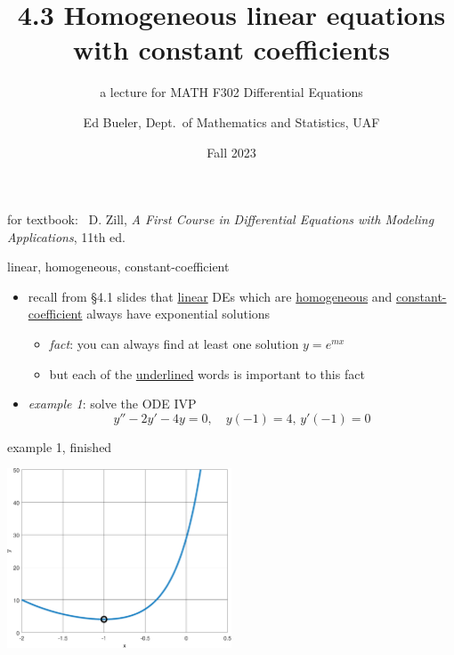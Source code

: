 \documentclass{beamer}
\title{4.3 Homogeneous linear equations \\ with constant coefficients}
\subtitle{a lecture for MATH F302 Differential Equations}
\author{Ed Bueler, Dept.~of Mathematics and Statistics, UAF}
\date{Fall 2023}
\begin{document}


\begin{frame}
\titlepage

\centerline{\tiny for textbook: \, D. Zill, \emph{A First Course in Differential Equations with Modeling Applications}, 11th ed.}
\end{frame}

\begin{frame}{linear, homogeneous, constant-coefficient}

\begin{itemize}
\item recall from \S4.1 slides that \underline{linear} DEs which are \underline{homogeneous} and \underline{constant-coefficient} \alert{always have exponential solutions}
    \begin{itemize}
    \item \emph{fact}: you can always find at least one solution $y=e^{mx}$
    \item but each of the \underline{underlined} words is important to this fact
    \end{itemize}
\item \emph{example 1}: solve the ODE IVP
    $$y'' -2 y' - 4 y = 0, \quad y(-1)=4, \, y'(-1)=0$$

\vspace{30mm}
\end{itemize}
\end{frame}


\begin{frame}{example 1, finished}

\vspace{35mm}

\hfill \includegraphics[width=0.5\textwidth]{figs/expodeivp2nd}
\end{frame}
\end{document}
